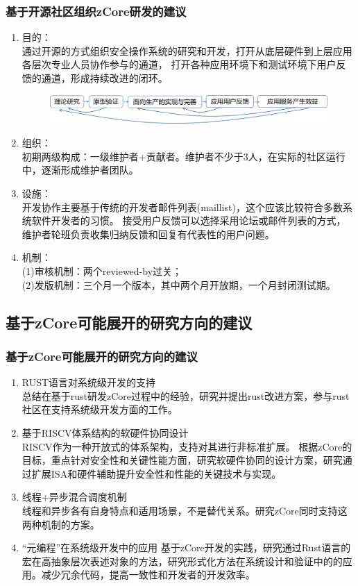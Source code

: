 \documentclass[
8pt, %
]{beamer}
\begin{document}
	\begin{frame}
		\frametitle{基于开源社区组织zCore研发的建议}
		\begin{enumerate}
			\item 目的：\\
			通过开源的方式组织安全操作系统的研究和开发，打开从底层硬件到上层应用各层次专业人员协作参与的通道，
			打开各种应用环境下和测试环境下用户反馈的通道，形成持续改进的闭环。
			\begin{figure}
				\includegraphics[width=1.0\linewidth]{open_community.png}
			\end{figure}
			\item 组织：\\
			初期两级构成：一级维护者+贡献者。维护者不少于3人，在实际的社区运行中，逐渐形成维护者团队。
			\item 设施：\\
			开发协作主要基于传统的开发者邮件列表(maillist)，这个应该比较符合多数系统软件开发者的习惯。
			接受用户反馈可以选择采用论坛或邮件列表的方式，维护者轮班负责收集归纳反馈和回复有代表性的用户问题。
			\item 机制：\\
			(1)审核机制：两个reviewed-by过关；\\
			(2)发版机制：三个月一个版本，其中两个月开放期，一个月封闭测试期。
		\end{enumerate}
	\end{frame}

	\subsection{基于zCore可能展开的研究方向的建议}
	
	\begin{frame}
		\frametitle{基于zCore可能展开的研究方向的建议}
		\begin{enumerate}
			\item RUST语言对系统级开发的支持\\
			总结在基于rust研发zCore过程中的经验，研究并提出rust改进方案，参与rust社区在支持系统级开发方面的工作。
			\item 基于RISCV体系结构的软硬件协同设计\\
			RISCV作为一种开放式的体系架构，支持对其进行非标准扩展。
			根据zCore的目标，重点针对安全性和关键性能方面，研究软硬件协同的设计方案，研究通过扩展ISA和硬件辅助提升安全性和性能的关键技术与实现。
			\item 线程+异步混合调度机制\\
			线程和异步各有自身特点和适用场景，不是替代关系。研究zCore同时支持这两种机制的方案。
			\item “元编程”在系统级开发中的应用
			基于zCore开发的实践，研究通过Rust语言的宏在高抽象层次表述对象的方法，研究形式化方法在系统设计和验证中的的应用。减少冗余代码，提高一致性和开发者的开发效率。
		\end{enumerate}
	\end{frame}
\end{document}
